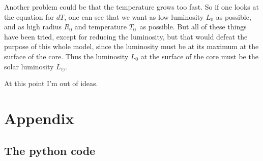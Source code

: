 \documentclass[a4paper,12pt]{article}
\begin{document}
Another problem could be that the temperature grows too fast. So if one looks at the equation for $dT$, one can see that we want as low luminosity $L_0$ as possible, and as high radius $R_0$ and temperature $T_0$ as possible. But all of these things have been tried, except for reducing the luminosity, but that would defeat the purpose of this whole model, since the luminosity must be at its maximum at the surface of the core. Thus the luminosity $L_0$ at the surface of the core must be the solar luminosity $L_\odot$.

At this point I'm out of ideas.

\newpage
\section{Appendix}
\subsection{The python code}
\end{document}
